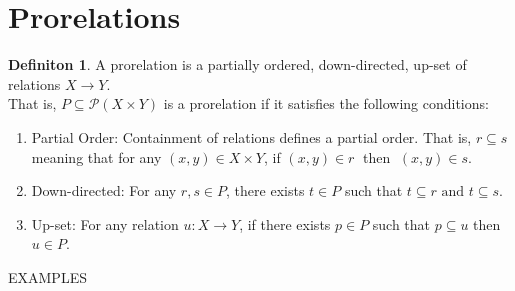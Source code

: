 \documentclass[18pt,a4paper]{article}
\theoremstyle{definition}
\newtheorem{definition}[theorem]{Definiton}
\begin{document}
		\section{Prorelations}

		\begin{definition}%
			A prorelation is a partially ordered, down-directed, up-set of relations $X \to Y$.\\
			That is, $P \subseteq \mathcal{P}(X \times Y)$ is a prorelation if it satisfies the
			following conditions:
			\begin{enumerate}[label=(\roman*)]
				\item Partial Order: Containment of relations defines a partial order.
					That is, $r \subseteq s$  meaning that for any $(x,y) \in X \times Y$,
					if  $(x,y)\in r\;$ then $\;(x,y)\in s$.
				\item Down-directed: For any $r,s \in P$, there exists $t \in P $ such that
					$t\subseteq r \text{ and } t \subseteq s$.
				\item Up-set: For any relation $u:X\to Y$, if there exists $p \in P$ such that
					$p \subseteq u $ then $u \in P$.
			\end{enumerate}
		\end{definition}

		EXAMPLES
\end{document}
